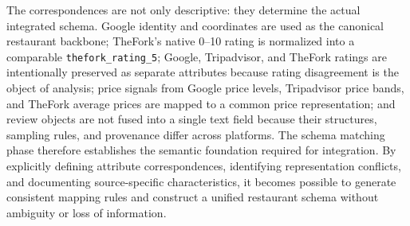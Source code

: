 The correspondences are not only descriptive: they determine the actual integrated schema. Google identity and coordinates are used as the canonical restaurant backbone; TheFork's native 0--10 rating is normalized into a comparable \texttt{thefork\_rating\_5}; Google, Tripadvisor, and TheFork ratings are intentionally preserved as separate attributes because rating disagreement is the object of analysis; price signals from Google price levels, Tripadvisor price bands, and TheFork average prices are mapped to a common price representation; and review objects are not fused into a single text field because their structures, sampling rules, and provenance differ across platforms. The schema matching phase therefore establishes the semantic foundation required for integration. By explicitly defining attribute correspondences, identifying representation conflicts, and documenting source-specific characteristics, it becomes possible to generate consistent mapping rules and construct a unified restaurant schema without ambiguity or loss of information.
